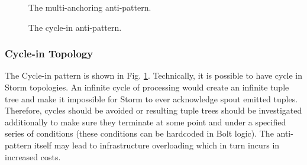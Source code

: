 
\begin{figure}
\centering 
{}\caption{The multi-anchoring anti-pattern.}\label{fig:multi-anchoring1}
\caption{The cycle-in anti-pattern.}\label{fig:cycle1}
\end{figure}


\subsubsection{Cycle-in Topology}

The Cycle-in pattern is shown in Fig. \ref{fig:cycle1}. Technically, it is possible to have cycle in Storm topologies. An infinite cycle of processing would create an infinite tuple tree and make it impossible for Storm to ever acknowledge spout emitted tuples. Therefore, cycles should be avoided or resulting tuple trees should be investigated additionally to make sure they terminate at some point and under a specified series of conditions (these conditions can be hardcoded in Bolt logic). The anti-pattern itself may lead to infrastructure overloading which in turn incurs in increased costs.

